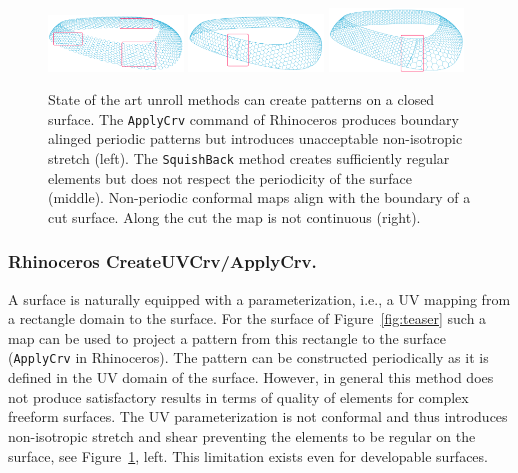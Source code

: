 \documentclass[article.tex]{subfiles}
\begin{document}
\begin{figure}[tb]
\centering
\includegraphics[width=0.32\textwidth]{images/failior-uv-marked.png}
\includegraphics[width=0.32\textwidth]{images/failior-squish-marked.png}
\includegraphics[width=0.32\textwidth]{images/failior-rectangle-marked.png}
\caption{State of the art unroll methods can create patterns on a closed surface.
The {\tt ApplyCrv} command of Rhinoceros produces boundary alinged periodic patterns but introduces unacceptable non-isotropic stretch (left). The {\tt SquishBack} method creates
sufficiently regular elements but does not respect the periodicity of the surface (middle).
Non-periodic conformal maps align with the boundary of a cut surface. Along the cut the 
map is not continuous (right).}
\label{fig:failure}
\end{figure}


\subsubsection{Rhinoceros CreateUVCrv/ApplyCrv.}
A \nurbs surface is naturally equipped with a parameterization, i.e.,
a UV mapping from a rectangle domain to the surface. For the surface
of Figure~\ref{fig:teaser} such a map can be used to project a pattern
from this rectangle to the surface ({\tt ApplyCrv} in Rhinoceros). The
pattern can be constructed periodically as it is defined in the UV
domain of the surface. However, in general this method does not
produce satisfactory results in terms of quality of elements for
complex freeform surfaces. The UV parameterization is not conformal
and thus introduces non-isotropic stretch and shear preventing the
elements to be regular on the surface, see Figure~\ref{fig:failure},
left. This limitation exists even for developable surfaces.
\end{document}
